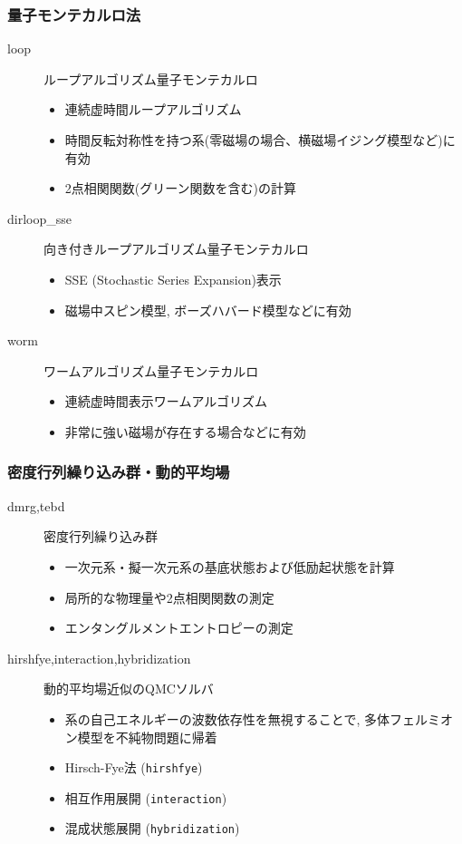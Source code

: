 \begin{frame}
  \frametitle{量子モンテカルロ法}
  \begin{description}
  \item[loop] ループアルゴリズム量子モンテカルロ
    \begin{itemize}
      \item 連続虚時間ループアルゴリズム
      \item 時間反転対称性を持つ系(零磁場の場合、横磁場イジング模型など)に有効
      \item 2点相関関数(グリーン関数を含む)の計算
    \end{itemize}
  \item[dirloop\_sse] 向き付きループアルゴリズム量子モンテカルロ
    \begin{itemize}
      \item SSE (Stochastic Series Expansion)表示
      \item 磁場中スピン模型, ボーズハバード模型などに有効
    \end{itemize}
  \item[worm] ワームアルゴリズム量子モンテカルロ
    \begin{itemize}
      \item 連続虚時間表示ワームアルゴリズム
      \item 非常に強い磁場が存在する場合などに有効
    \end{itemize}
  \end{description}
\end{frame}

\begin{frame}
  \frametitle{密度行列繰り込み群・動的平均場}
  \begin{description}
  \item[dmrg,tebd] 密度行列繰り込み群
    \begin{itemize}
      \item 一次元系・擬一次元系の基底状態および低励起状態を計算
      \item 局所的な物理量や2点相関関数の測定
      \item エンタングルメントエントロピーの測定
    \end{itemize}
  \item[hirshfye,interaction,hybridization] 動的平均場近似のQMCソルバ
    \begin{itemize}
      \item 系の自己エネルギーの波数依存性を無視することで, 多体フェルミオン模型を不純物問題に帰着
      \item Hirsch-Fye法 ({\tt hirshfye})
      \item 相互作用展開 ({\tt interaction})
      \item 混成状態展開 ({\tt hybridization})
    \end{itemize}
  \end{description}
\end{frame}


